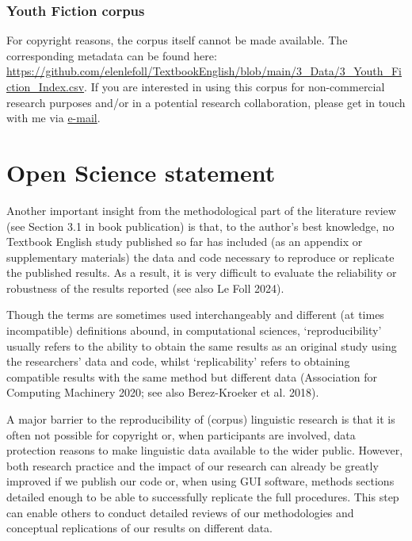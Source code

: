 \documentclass[
  letterpaper,
  DIV=11,
  numbers=noendperiod]{scrreprt}
\begin{document}
\subsection{Youth Fiction corpus}\label{youth-fiction-corpus}

For copyright reasons, the corpus itself cannot be made available. The
corresponding metadata can be found here:
\url{https://github.com/elenlefoll/TextbookEnglish/blob/main/3_Data/3_Youth_Fiction_Index.csv}.
If you are interested in using this corpus for non-commercial research
purposes and/or in a potential research collaboration, please get in
touch with me via \href{https://orcid.org/0000-0002-5839-8010}{e-mail}.


\chapter{Open Science statement}\label{open-science-statement}

Another important insight from the methodological part of the literature
review (see Section 3.1 in book publication) is that, to the author's
best knowledge, no Textbook English study published so far has included
(as an appendix or supplementary materials) the data and code necessary
to reproduce or replicate the published results. As a result, it is very
difficult to evaluate the reliability or robustness of the results
reported (see also Le Foll 2024).

Though the terms are sometimes used interchangeably and different (at
times incompatible) definitions abound, in computational sciences,
`reproducibility' usually refers to the ability to obtain the same
results as an original study using the researchers' data and code,
whilst `replicability' refers to obtaining compatible results with the
same method but different data (Association for Computing Machinery
2020; see also Berez-Kroeker et al. 2018).

A major barrier to the reproducibility of (corpus) linguistic research
is that it is often not possible for copyright or, when participants are
involved, data protection reasons to make linguistic data available to
the wider public. However, both research practice and the impact of our
research can already be greatly improved if we publish our code or, when
using GUI software, methods sections detailed enough to be able to
successfully replicate the full procedures. This step can enable others
to conduct detailed reviews of our methodologies and conceptual
replications of our results on different data.
\end{document}
